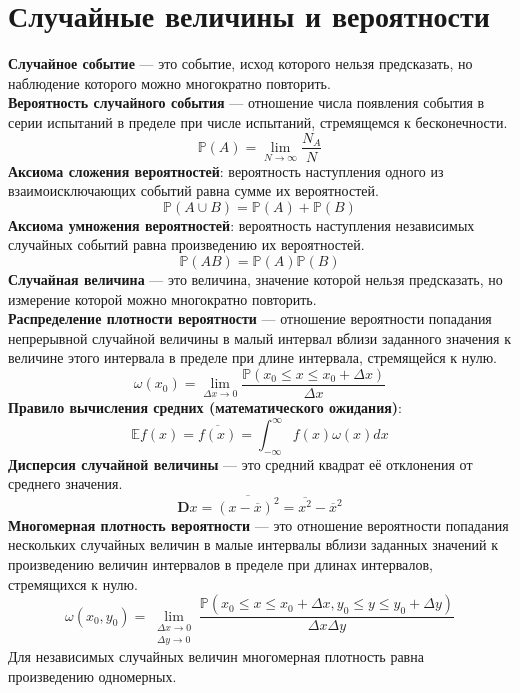\documentclass[fleqn,a4paper,12pt,titlepage,finall]{article}
\begin{document}
\section{Случайные величины и вероятности}
{\bf Случайное событие} --- это событие, исход которого нельзя предсказать, но
наблюдение которого можно многократно повторить. \\
{\bf Вероятность случайного события} --- отношение числа появления события в
серии испытаний в пределе при числе испытаний, стремящемся к бесконечности. \\
\[\mathbb{P}(A) = \lim_{N \to \infty} \frac{N_A}{N}\]
{\bf Аксиома сложения вероятностей}: вероятность наступления одного из
взаимоисключающих событий равна сумме их вероятностей. \\
\[\mathbb{P}(A\cup B) = \mathbb{P}(A) + \mathbb{P}(B)\]
{\bf Аксиома умножения вероятностей}: вероятность наступления независимых
случайных событий равна произведению их вероятностей.
\[\mathbb{P}(AB) = \mathbb{P}(A) \mathbb{P}(B)\]
{\bf Случайная величина} --- это величина, значение которой нельзя предсказать,
но измерение которой можно многократно повторить. \\
{\bf Распределение плотности вероятности} --- отношение вероятности попадания
непрерывной случайной величины в малый интервал вблизи заданного значения к
величине этого интервала в пределе при длине интервала, стремящейся к нулю.
\[\omega(x_0) = \lim_{\Delta x \to 0} \frac{\mathbb{P}(x_0 \leq x \leq
x_0+\Delta x)}{\Delta x}\]
{\bf Правило вычисления средних (математического ожидания)}:
\[\mathbb{E}f(x) = \overline{f(x)} = \int_{-\infty}^{\infty}f(x)\omega(x)dx\]
{\bf Дисперсия случайной величины} --- это средний квадрат её отклонения от
среднего значения.
\[\mathbf{D}x = \overline{(x-\overline{x})^2} = \overline{x^2} -
\overline{x}^2\]
{\bf Многомерная плотность вероятности} --- это отношение вероятности попадания
нескольких случайных величин в малые интервалы вблизи заданных значений к
произведению величин интервалов в пределе при длинах интервалов, стремящихся к
нулю.
\[\omega(x_0, y_0) = \lim_{\substack{\Delta x \to 0\\ \Delta y \to 0}}
\frac{\mathbb{P}(x_0 \leq x \leq x_0+\Delta x, y_0 \leq y \leq y_0+\Delta
y)}{\Delta x\Delta y}\]
Для независимых случайных величин многомерная плотность равна произведению
одномерных.
\end{document}
